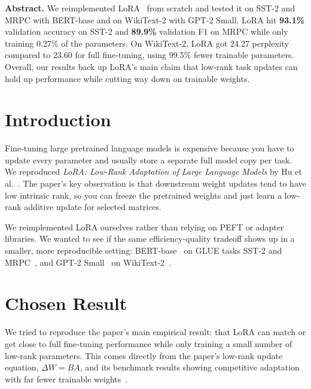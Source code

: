 \documentclass[11pt,twocolumn]{article}
\begin{document}

\noindent\textbf{Abstract.}
We reimplemented LoRA~\cite{hu2022lora} from scratch and tested it on SST-2 and MRPC with BERT-base and on WikiText-2 with GPT-2 Small. LoRA hit \textbf{93.1\%} validation accuracy on SST-2 and \textbf{89.9\%} validation F1 on MRPC while only training 0.27\% of the parameters. On WikiText-2, LoRA got 24.27 perplexity compared to 23.60 for full fine-tuning, using 99.5\% fewer trainable parameters. Overall, our results back up LoRA's main claim that low-rank task updates can hold up performance while cutting way down on trainable weights.

\section{Introduction}
Fine-tuning large pretrained language models is expensive because you have to update every parameter and usually store a separate full model copy per task. We reproduced \emph{LoRA: Low-Rank Adaptation of Large Language Models} by Hu et al.~\cite{hu2022lora}. The paper's key observation is that downstream weight updates tend to have low intrinsic rank, so you can freeze the pretrained weights and just learn a low-rank additive update for selected matrices.

We reimplemented LoRA ourselves rather than relying on PEFT or adapter libraries. We wanted to see if the same efficiency-quality tradeoff shows up in a smaller, more reproducible setting: BERT-base~\cite{devlin2019bert} on GLUE tasks SST-2 and MRPC~\cite{wang2019glue,socher2013sst,dolan2005mrpc}, and GPT-2 Small~\cite{radford2019language} on WikiText-2~\cite{merity2017wikitext}.

\section{Chosen Result}
We tried to reproduce the paper's main empirical result: that LoRA can match or get close to full fine-tuning performance while only training a small number of low-rank parameters. This comes directly from the paper's low-rank update equation, $\Delta W=BA$, and its benchmark results showing competitive adaptation with far fewer trainable weights~\cite{hu2022lora}.
\end{document}
